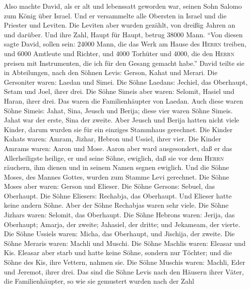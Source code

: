  Also machte David, als er alt und lebenssatt geworden
war, seinen Sohn Salomo zum König über Israel.  Und er
versammelte alle Obersten in Israel und die Priester und Leviten.
 Die Leviten aber wurden gezählt, von dreißig Jahren an
und darüber. Und ihre Zahl, Haupt für Haupt, betrug 38000 Mann.
 ``Von diesen sagte David, sollen sein: 24000 Mann, die
das Werk am Hause des \textsc{Herrn} treiben, und 6000 Amtleute und
Richter,  und 4000 Torhüter und 4000, die den
\textsc{Herrn} preisen mit Instrumenten, die ich für den Gesang gemacht
habe.''  David teilte sie in Abteilungen, nach den Söhnen
Levis: Gerson, Kahat und Merari.  Die Gersoniter waren:
Laedan und Simei.  Die Söhne Laedans: Jechiel, das
Oberhaupt, Setam und Joel, ihrer drei.  Die Söhne Simeis
aber waren: Selomit, Hasiel und Haran, ihrer drei. Das waren die
Familienhäupter von Laedan.  Auch diese waren Söhne
Simeis: Jahat, Sina, Jeusch und Berija; diese vier waren Söhne Simeis.
 Jahat war der erste, Sina der zweite. Aber Jeusch und
Berija hatten nicht viele Kinder, darum wurden sie für ein einziges
Stammhaus gerechnet.  Die Kinder Kahats waren: Amram,
Jizhar, Hebron und Ussiel, ihrer vier.  Die Kinder Amrams
waren: Aaron und Mose. Aaron aber ward ausgesondert, daß er das
Allerheiligste heilige, er und seine Söhne, ewiglich, daß sie vor dem
\textsc{Herrn} räuchern, ihm dienen und in seinem Namen segnen ewiglich.
 Und die Söhne Moses, des Mannes Gottes, wurden zum
Stamme Levi gerechnet.  Die Söhne Moses aber waren:
Gerson und Elieser.  Die Söhne Gersons: Sebuel, das
Oberhaupt.  Die Söhne Eliesers: Rechabja, das Oberhaupt.
Und Elieser hatte keine andern Söhne. Aber der Söhne Rechabjas waren
sehr viele.  Die Söhne Jizhars waren: Selomit, das
Oberhaupt.  Die Söhne Hebrons waren: Jerija, das
Oberhaupt; Amarja, der zweite; Jahasiel, der dritte; und Jekameam, der
vierte.  Die Söhne Ussiels waren: Micha, das Oberhaupt,
und Jischija, der zweite.  Die Söhne Meraris waren:
Machli und Muschi. Die Söhne Machlis waren: Eleasar und Kis.
 Eleasar aber starb und hatte keine Söhne, sondern nur
Töchter; und die Söhne des Kis, ihre Vettern, nahmen sie.
 Die Söhne Muschis waren: Machli, Eder und Jeremot, ihrer
drei.  Das sind die Söhne Levis nach den Häusern ihrer
Väter, die Familienhäupter, so wie sie gemustert wurden nach der Zahl
